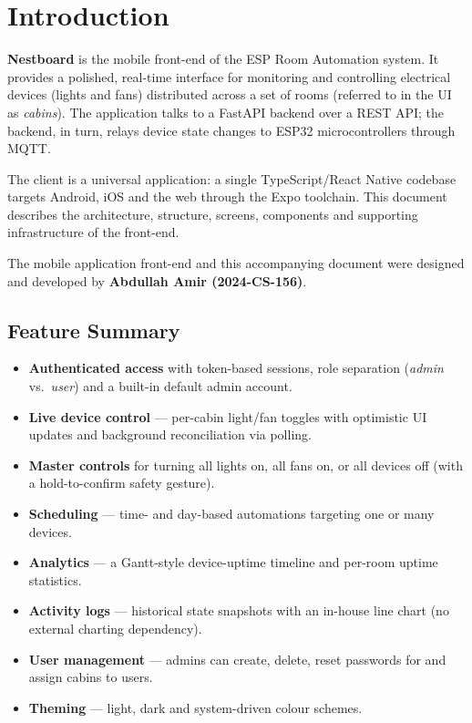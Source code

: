 \documentclass[11pt,a4paper]{article}
\begin{document}
\tableofcontents
\thispagestyle{fancy}
\newpage

\section{Introduction}

\textbf{Nestboard} is the mobile front-end of the ESP Room Automation system. It
provides a polished, real-time interface for monitoring and controlling
electrical devices (lights and fans) distributed across a set of rooms
(referred to in the UI as \emph{cabins}). The application talks to a FastAPI
backend over a REST API; the backend, in turn, relays device state changes to
ESP32 microcontrollers through MQTT.

The client is a universal application: a single TypeScript/React Native codebase
targets Android, iOS and the web through the Expo toolchain. This document
describes the architecture, structure, screens, components and supporting
infrastructure of the front-end.

The mobile application front-end and this accompanying document were designed and
developed by \textbf{Abdullah Amir (2024-CS-156)}.

\subsection{Feature Summary}

\begin{itemize}[leftmargin=1.4em]
  \item \textbf{Authenticated access} with token-based sessions, role separation
        (\emph{admin} vs.\ \emph{user}) and a built-in default admin account.
  \item \textbf{Live device control} — per-cabin light/fan toggles with
        optimistic UI updates and background reconciliation via polling.
  \item \textbf{Master controls} for turning all lights on, all fans on, or all
        devices off (with a hold-to-confirm safety gesture).
  \item \textbf{Scheduling} — time- and day-based automations targeting one or
        many devices.
  \item \textbf{Analytics} — a Gantt-style device-uptime timeline and per-room
        uptime statistics.
  \item \textbf{Activity logs} — historical state snapshots with an in-house
        line chart (no external charting dependency).
  \item \textbf{User management} — admins can create, delete, reset passwords for
        and assign cabins to users.
  \item \textbf{Theming} — light, dark and system-driven colour schemes.
\end{itemize}
\end{document}
